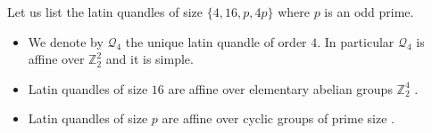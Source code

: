 \documentclass[a4paper, english, 9pt]{amsart}
\theoremstyle{plain}
\theoremstyle{definition}
\def\aff#1{\mathrm{Aff}#1}
\def\Q{\mathcal{Q}_{\mathrm{Hom}}}
\def\Z{\mathbb Z}
\def\Q{\mathcal Q}
\begin{document}
Let us list the latin quandles of size $\{4,16,p,4p\}$ where $p$ is an odd prime. 
\begin{itemize}
    \item[(i)] We denote by $\Q_4$ the unique latin quandle of order $4$. In particular $\Q_4$ is affine over $\Z_2^2$ and it is simple.%


\item[(ii)] Latin quandles of size $16$ are affine over elementary abelian groups $\Z_2^4$ \cite{RIG}.

\item[(iii)] Latin quandles of size $p$ are affine over cyclic groups of prime size \cite{EGS}. 






\end{itemize}
\end{document}
